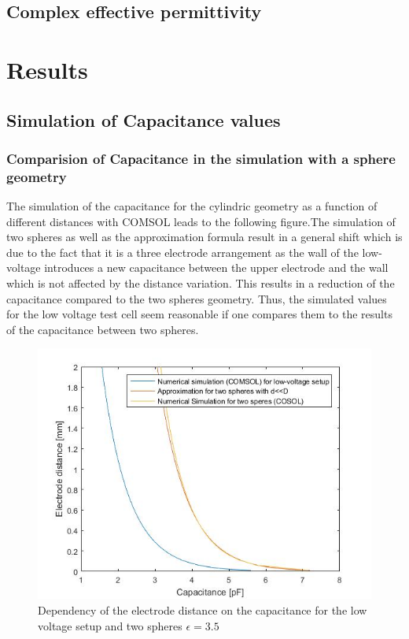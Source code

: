 \section{Complex effective permittivity}
\subsection{}

\chapter{Results}
\section{Simulation of Capacitance values}
\subsection{Comparision of Capacitance in the simulation with a sphere geometry}
The simulation of the capacitance for the cylindric geometry as a function of different distances with COMSOL leads to the following figure.The simulation of two spheres as well as the approximation formula result in a general shift which is due to the fact that it is a three electrode arrangement as the wall of the low-voltage introduces a new capacitance between the upper electrode and the wall which is not affected by the distance variation. This results in a reduction of the capacitance compared to the two spheres geometry. Thus, the simulated values for the low voltage test cell seem reasonable if one compares them to the results of the capacitance between two spheres. \newline 


\begin{figure}[htbp]
	\centering
	\includegraphics[scale=0.3]{figures/Comparison_Low_voltage_Two_spheres}		


	\caption[Kurze Abbildungsbeschreibung]{Dependency of the electrode distance on the capacitance for the low voltage setup and two spheres $\epsilon = 3.5$ }%

	\label{fig.waveforms}
\end{figure}

